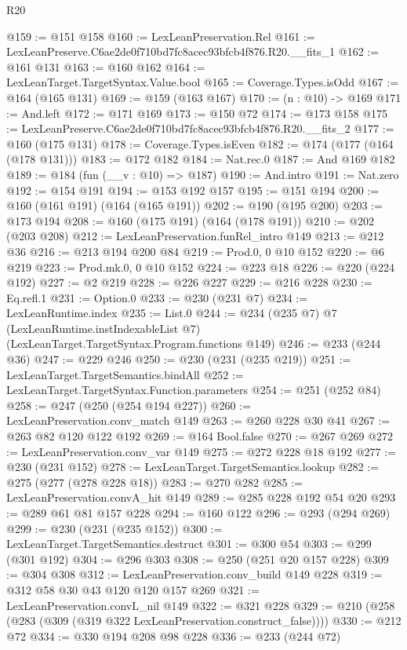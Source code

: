 \begin{lexlean}{R20}
\begin{coremodule}
@159 := @151 @158
@160 := LexLeanPreservation.Rel
@161 := LexLeanPreserve.C6ae2de0f710bd7fc8acec93bfcb4f876.R20.__fits_1
@162 := @161 @131
@163 := @160 @162
@164 := LexLeanTarget.TargetSyntax.Value.bool
@165 := Coverage.Types.isOdd
@167 := @164 (@165 @131)
@169 := @159 (@163 @167)
@170 := (n : @10) -> @169
@171 := And.left
@172 := @171 @169
@173 := @150 @72
@174 := @173 @158
@175 := LexLeanPreserve.C6ae2de0f710bd7fc8acec93bfcb4f876.R20.__fits_2
@177 := @160 (@175 @131)
@178 := Coverage.Types.isEven
@182 := @174 (@177 (@164 (@178 @131)))
@183 := @172 @182
@184 := Nat.rec.{0}
@187 := And @169 @182
@189 := @184 (fun (__v : @10) => @187)
@190 := And.intro
@191 := Nat.zero
@192 := @154 @191
@194 := @153 @192 @157
@195 := @151 @194
@200 := @160 (@161 @191) (@164 (@165 @191))
@202 := @190 (@195 @200)
@203 := @173 @194
@208 := @160 (@175 @191) (@164 (@178 @191))
@210 := @202 (@203 @208)
@212 := LexLeanPreservation.funRel_intro @149
@213 := @212 @36
@216 := @213 @194 @200 @84
@219 := Prod.{0, 0} @10 @152
@220 := @6 @219
@223 := Prod.mk.{0, 0} @10 @152
@224 := @223 @18
@226 := @220 (@224 @192)
@227 := @2 @219
@228 := @226 @227
@229 := @216 @228
@230 := Eq.refl.{1}
@231 := Option.{0}
@233 := @230 (@231 @7)
@234 := LexLeanRuntime.index
@235 := List.{0}
@244 := @234
    (@235 @7)
    @7
    (LexLeanRuntime.instIndexableList @7)
    (LexLeanTarget.TargetSyntax.Program.functions @149)
@246 := @233 (@244 @36)
@247 := @229 @246
@250 := @230 (@231 (@235 @219))
@251 := LexLeanTarget.TargetSemantics.bindAll
@252 := LexLeanTarget.TargetSyntax.Function.parameters
@254 := @251 (@252 @84)
@258 := @247 (@250 (@254 @194 @227))
@260 := LexLeanPreservation.conv_match @149
@263 := @260 @228 @30 @41
@267 := @263 @82 @120 @122 @192
@269 := @164 Bool.false
@270 := @267 @269
@272 := LexLeanPreservation.conv_var @149
@275 := @272 @228 @18 @192
@277 := @230 (@231 @152)
@278 := LexLeanTarget.TargetSemantics.lookup
@282 := @275 (@277 (@278 @228 @18))
@283 := @270 @282
@285 := LexLeanPreservation.convA_hit @149
@289 := @285 @228 @192 @54 @20
@293 := @289 @61 @81 @157 @228
@294 := @160 @122
@296 := @293 (@294 @269)
@299 := @230 (@231 (@235 @152))
@300 := LexLeanTarget.TargetSemantics.destruct
@301 := @300 @54
@303 := @299 (@301 @192)
@304 := @296 @303
@308 := @250 (@251 @20 @157 @228)
@309 := @304 @308
@312 := LexLeanPreservation.conv_build @149 @228
@319 := @312 @58 @30 @43 @120 @120 @157 @269
@321 := LexLeanPreservation.convL_nil @149
@322 := @321 @228
@329 := @210 (@258 (@283 (@309 (@319 @322 LexLeanPreservation.construct_false))))
@330 := @212 @72
@334 := @330 @194 @208 @98 @228
@336 := @233 (@244 @72)

\end{coremodule}
\end{lexlean}
